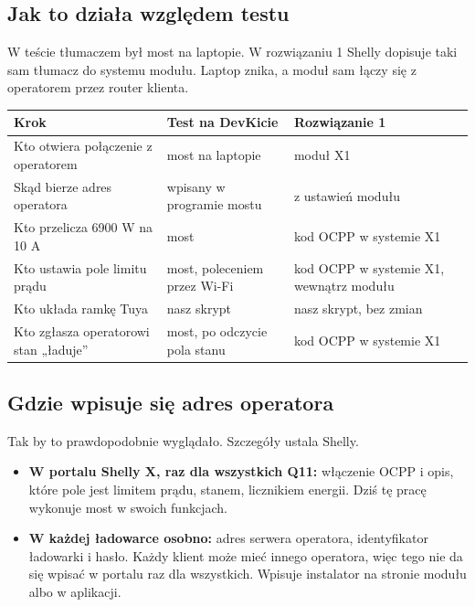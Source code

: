 \documentclass[11pt,a4paper]{article}
\begin{document}
\subsection{Jak to działa względem testu}

W teście tłumaczem był most na laptopie. W rozwiązaniu 1 Shelly dopisuje taki sam tłumacz do systemu modułu. Laptop znika, a moduł sam łączy się z operatorem przez router klienta.


\begin{longtable}{>{\raggedright\arraybackslash}p{6.12cm}>{\raggedright\arraybackslash}p{4.33cm}>{\raggedright\arraybackslash}p{4.83cm}}
\toprule
\rowcolor{apteallight}\textbf{Krok} & \textbf{Test na DevKicie} & \textbf{Rozwiązanie 1} \\
\midrule\endhead
\bottomrule\endfoot
Kto otwiera połączenie z operatorem & most na laptopie & moduł X1 \\
Skąd bierze adres operatora & wpisany w programie mostu & z ustawień modułu \\
Kto przelicza 6900 W na 10 A & most & kod OCPP w systemie X1 \\
Kto ustawia pole limitu prądu & most, poleceniem przez Wi-Fi & kod OCPP w systemie X1, wewnątrz modułu \\
Kto układa ramkę Tuya & nasz skrypt & nasz skrypt, bez zmian \\
Kto zgłasza operatorowi stan „ładuje” & most, po odczycie pola stanu & kod OCPP w systemie X1 \\
\end{longtable}

\subsection{Gdzie wpisuje się adres operatora}

Tak by to prawdopodobnie wyglądało. Szczegóły ustala Shelly.


\begin{itemize}
\item \textbf{W portalu Shelly X, raz dla wszystkich Q11:} włączenie OCPP i opis, które pole jest limitem prądu, stanem, licznikiem energii. Dziś tę pracę wykonuje most w swoich funkcjach.
\item \textbf{W każdej ładowarce osobno:} adres serwera operatora, identyfikator ładowarki i hasło. Każdy klient może mieć innego operatora, więc tego nie da się wpisać w portalu raz dla wszystkich. Wpisuje instalator na stronie modułu albo w aplikacji.
\end{itemize}
\end{document}
